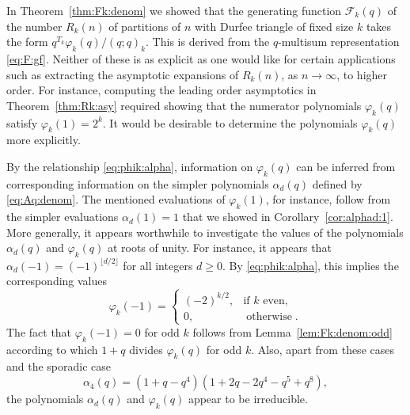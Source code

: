 \documentclass[11pt]{article}
\theoremstyle{plain}
\theoremstyle{definition}
\begin{document}
In Theorem~\ref{thm:Fk:denom} we showed that the generating function
$\mathcal{F}_k (q)$ of the number $R_k (n)$ of partitions of $n$ with Durfee
triangle of fixed size $k$ takes the form $q^{T_k} \varphi_k (q) / (q ; q)_k$.
This is derived from the $q$-multisum representation \eqref{eq:F:gf}. Neither
of these is as explicit as one would like for certain applications such as
extracting the asymptotic expansions of $R_k (n)$, as $n \rightarrow \infty$,
to higher order. For instance, computing the leading order asymptotics in
Theorem~\ref{thm:Rk:asy} required showing that the numerator polynomials
$\varphi_k (q)$ satisfy $\varphi_k (1) = 2^k$. It would be desirable to
determine the polynomials $\varphi_k (q)$ more explicitly.

By the relationship \eqref{eq:phik:alpha}, information on $\varphi_k (q)$ can
be inferred from corresponding information on the simpler polynomials
$\alpha_d (q)$ defined by \eqref{eq:Aq:denom}. The mentioned evaluations of
$\varphi_k (1)$, for instance, follow from the simpler evaluations $\alpha_d
(1) = 1$ that we showed in Corollary~\ref{cor:alphad:1}. More generally, it
appears worthwhile to investigate the values of the polynomials $\alpha_d (q)$
and $\varphi_k (q)$ at roots of unity. For instance, it appears that $\alpha_d
(- 1) = (- 1)^{\lfloor d / 2 \rfloor}$ for all integers $d \geq 0$. By
\eqref{eq:phik:alpha}, this implies the corresponding values
\begin{equation*}
  \varphi_k (- 1) = \left\{\begin{array}{ll}
     (- 2)^{k / 2}, & \text{if $k$ even,}\\
     0, & \operatorname{otherwise} .
   \end{array}\right.
\end{equation*}
The fact that $\varphi_k (- 1) = 0$ for odd $k$ follows from
Lemma~\ref{lem:Fk:denom:odd} according to which $1 + q$ divides $\varphi_k
(q)$ for odd $k$. Also, apart from these cases and the sporadic case
\begin{equation*}
  \alpha_4 (q) = (1 + q - q^4) (1 + 2 q - 2 q^4 - q^5 + q^8),
\end{equation*}
the polynomials $\alpha_d (q)$ and $\varphi_k (q)$ appear to be irreducible.
\end{document}
